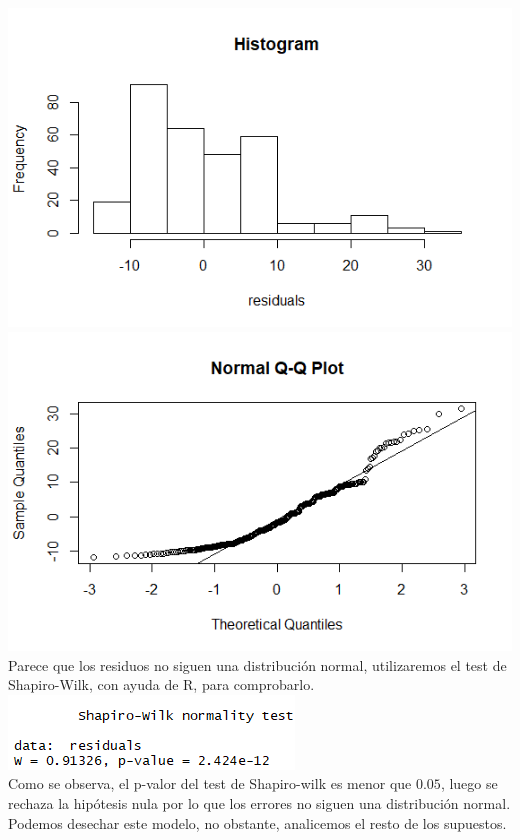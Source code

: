 \documentclass[twoside]{article}
\begin{document}
\begin{multicols}{2}
\includegraphics[scale = 0.4]{images/pic_15.png}
\includegraphics[scale=0.4]{images/pic_16.png} \\

Parece que los residuos no siguen una distribuci\'on normal, utilizaremos el test de Shapiro-Wilk, con ayuda de R, para comprobarlo.\\

\includegraphics[scale = 0.6]{images/pic_17.png} \\

Como se observa, el p-valor del test de Shapiro-wilk es menor que $0.05$, luego se rechaza la hip\'otesis nula por lo que los errores no siguen una distribuci\'on normal. Podemos desechar este modelo, no obstante, analicemos el resto de los supuestos.\\


\end{multicols}
\end{document}
